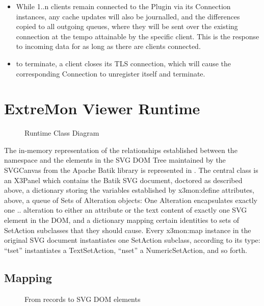 \begin{itemize}
\item While 1..n clients remain connected to the \diffproto{}Plugin
via its \diffproto{}Connection instances, any cache updates will also
be journalled, and the differences copied to all outgoing queues, where
they will be sent over the existing connection at the tempo attainable
by the specific client. This is the response to incoming data for as
long as there are clients connected.

\item to terminate, a client closes its TLS connection, which will
cause the corresponding \diffproto{}Connection to unregister itself
and terminate.

\end{itemize}

\section{ExtreMon Viewer Runtime}

\begin{figure}[htbp]
	\caption{Runtime Class Diagram}
	\label{fig:classes}
\end{figure}

The in-memory representation of the relationships established between the
\rawproto{} namespace and the elements in the SVG DOM Tree maintained
by the SVGCanvas from the Apache Batik library is represented in
. The central class is an X3Panel which contains
the Batik SVG document, doctored as described above, a dictionary storing
the variables established by x3mon:define attributes, above, a queue
of Sets of Alteration objects: One Alteration encapsulates exactly one
.. alteration to either an attribute or the text content of exactly one
SVG element in the DOM, and a dictionary mapping certain \rawproto{}
identities to sets of SetAction subclasses that they should cause. Every
x3mon:map instance in the original SVG document instantiates one SetAction
subclass, according to its type: ``tset'' instantiates a TextSetAction,
``nset'' a NumericSetAction, and so forth.

\subsection*{Mapping}

\begin{figure}[htbp]
	 \caption{From \rawproto{} records to SVG DOM elements}
	\label{fig:mappings}
\end{figure}

